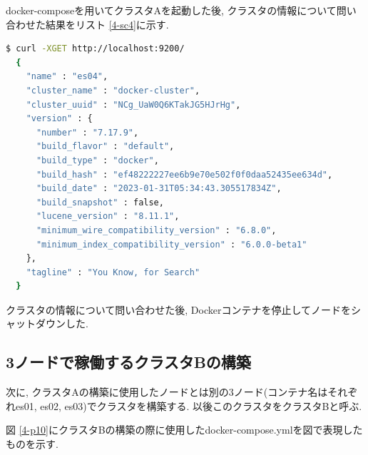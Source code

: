 docker-composeを用いてクラスタAを起動した後, クラスタの情報について問い合わせた結果をリスト \ref{4-sc4}に示す.

\begin{lstlisting}[language=bash, caption=クラスタAの情報について問い合わせた結果, label=4-sc4, breaklines=false]
  $ curl -XGET http://localhost:9200/
  {
    "name" : "es04",
    "cluster_name" : "docker-cluster",
    "cluster_uuid" : "NCg_UaW0Q6KTakJG5HJrHg",
    "version" : {
      "number" : "7.17.9",
      "build_flavor" : "default",
      "build_type" : "docker",
      "build_hash" : "ef48222227ee6b9e70e502f0f0daa52435ee634d",
      "build_date" : "2023-01-31T05:34:43.305517834Z",
      "build_snapshot" : false,
      "lucene_version" : "8.11.1",
      "minimum_wire_compatibility_version" : "6.8.0",
      "minimum_index_compatibility_version" : "6.0.0-beta1"
    },
    "tagline" : "You Know, for Search"
  }
\end{lstlisting}

クラスタの情報について問い合わせた後, Dockerコンテナを停止してノードをシャットダウンした.

\subsection{3ノードで稼働するクラスタBの構築}

次に, クラスタAの構築に使用したノードとは別の3ノード(コンテナ名はそれぞれes01, es02, es03)でクラスタを構築する. 以後このクラスタをクラスタBと呼ぶ.

図 \ref{4-p10}にクラスタBの構築の際に使用したdocker-compose.ymlを図で表現したものを示す.

